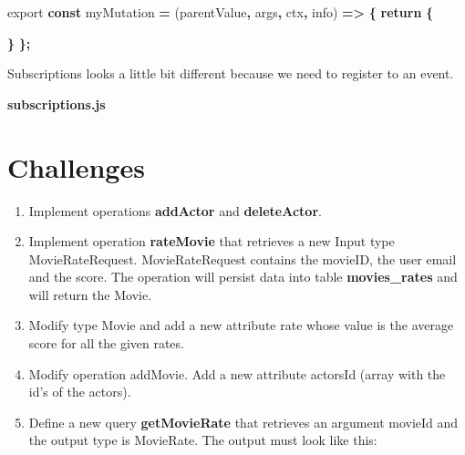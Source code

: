\documentclass[]{book}
\newenvironment{Shaded}{\begin{snugshade}}{\end{snugshade}}
\newcommand{\KeywordTok}[1]{\textcolor[rgb]{0.13,0.29,0.53}{\textbf{#1}}}
\newcommand{\DataTypeTok}[1]{\textcolor[rgb]{0.13,0.29,0.53}{#1}}
\newcommand{\SpecialCharTok}[1]{\textcolor[rgb]{0.00,0.00,0.00}{#1}}
\newcommand{\VerbatimStringTok}[1]{\textcolor[rgb]{0.31,0.60,0.02}{#1}}
\newcommand{\ImportTok}[1]{#1}
\newcommand{\VariableTok}[1]{\textcolor[rgb]{0.00,0.00,0.00}{#1}}
\newcommand{\ControlFlowTok}[1]{\textcolor[rgb]{0.13,0.29,0.53}{\textbf{#1}}}
\newcommand{\OperatorTok}[1]{\textcolor[rgb]{0.81,0.36,0.00}{\textbf{#1}}}
\newcommand{\AttributeTok}[1]{\textcolor[rgb]{0.77,0.63,0.00}{#1}}
\newcommand{\NormalTok}[1]{#1}
\providecommand{\tightlist}{%
  \setlength{\itemsep}{0pt}\setlength{\parskip}{0pt}}
\begin{document}
\begin{Shaded}
\begin{Highlighting}[]
\ImportTok{export} \KeywordTok{const}\NormalTok{ myMutation }\OperatorTok{=}\NormalTok{ (parentValue}\OperatorTok{,}\NormalTok{ args}\OperatorTok{,}\NormalTok{ ctx}\OperatorTok{,}\NormalTok{ info) }\OperatorTok{=>} \OperatorTok{\{}
    \ControlFlowTok{return} \OperatorTok{\{}
              
    \OperatorTok{\}}
\OperatorTok{\};}
\end{Highlighting}
\end{Shaded}

Subscriptions looks a little bit different because we need to register
to an event.

\textbf{subscriptions.js}

\begin{Shaded}
\end{Shaded}

\section{Challenges}\label{challenges-2}

\begin{enumerate}
\def\labelenumi{\arabic{enumi}.}
\tightlist
\item
  Implement operations \textbf{addActor} and \textbf{deleteActor}.
\item
  Implement operation \textbf{rateMovie} that retrieves a new Input type
  MovieRateRequest. MovieRateRequest contains the movieID, the user
  email and the score. The operation will persist data into table
  \textbf{movies\_rates} and will return the Movie.
\item
  Modify type Movie and add a new attribute rate whose value is the
  average score for all the given rates.
\item
  Modify operation addMovie. Add a new attribute actorsId (array with
  the id's of the actors).
\item
  Define a new query \textbf{getMovieRate} that retrieves an argument
  movieId and the output type is MovieRate. The output must look like
  this:
\end{enumerate}
\end{document}

